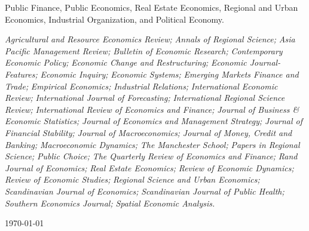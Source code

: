 \documentclass{xetexCV}
\begin{document}
Public Finance, Public Economics, Real Estate Economics, Regional and Urban Economics, Industrial Organization,  and Political Economy.


\nocite{*}



\begin{flushleft}
\emph{Agricultural and Resource Economics Review;}
\emph{Annals of Regional Science;}
\emph{Asia Pacific Management Review;}
\emph{Bulletin of Economic Research;}
\emph{Contemporary Economic Policy;} 
\emph{Economic Change and Restructuring;}
\emph{Economic Journal-Features;} 
\emph{Economic Inquiry;}
\emph{Economic Systems;}
\emph{Emerging Markets Finance and Trade;}
\emph{Empirical Economics;}
\emph{Industrial Relations;} 
\emph{International Economic Review;} 
\emph{International Journal of Forecasting;}
\emph{International Regional Science Review;}
\emph{International Review of Economics and Finance;}
\emph{Journal of Business \& Economic Statistics;}
\emph{Journal of Economics and Management Strategy;} 
\emph{Journal of Financial Stability;}
\emph{Journal of Macroeconomics;}
\emph{Journal of Money, Credit and Banking;} 
\emph{Macroeconomic Dynamics;}
\emph{The Manchester School;} 
\emph{Papers in Regional Science;} 
\emph{Public Choice;}
\emph{The Quarterly Review of Economics and Finance;}
\emph{Rand Journal of Economics;} 
\emph{Real Estate Economics;}
\emph{Review of Economic Dynamics;} 
\emph{Review of Economic Studies;} 
\emph{Regional Science and Urban Economics;} 
\emph{Scandinavian Journal of Economics;}
\emph{Scandinavian Journal of Public Health;} 
\emph{Southern Economics Journal;}
\emph{Spatial Economic Analysis.}
\end{flushleft}
\begin{flushleft}
\today
\end{flushleft}
\end{document}
